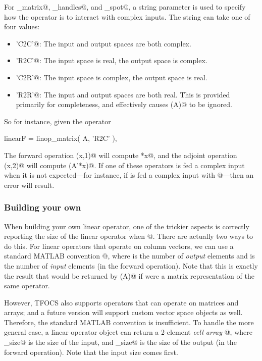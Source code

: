 \documentclass{article}
\begin{document}
For \verb@linop_matrix@, \verb@linop_handles@, and \verb@linop_spot@, a
string parameter \verb@cmode@ is used to specify how the operator is to interact
with complex inputs. The string can take one of four values:
\begin{itemize}
\item \verb@'C2C'@: The input and output spaces are both complex.
\item \verb@'R2C'@: The input space is real, the output space is complex.
\item \verb@'C2R'@: The input space is complex, the output space is real.
\item \verb@'R2R'@: The input and output spaces are both real. This is provided
primarily for completeness, and effectively causes \verb@imag(A)@ to be ignored.
\end{itemize}
So for instance, given the operator
\begin{code}
	linearF = linop_matrix( A, 'R2C' ),
\end{code}
The forward operation \verb@linearF(x,1)@ will compute \verb@A*x@, and the
adjoint operation \verb@linearF(x,2)@ will compute \verb@real(A'*x)@. If
one of these operators is fed a complex input when it is not expected---for
instance, if \verb@linearF@ is fed a complex input with @---then
an error will result.

\subsubsection{Building your own}
\label{sec:linearb}

When building your own linear operator, one of the trickier
aspects is correctly reporting the size of the linear operator when
@. There are actually two ways to do this. For linear
operators that operate on column vectors, we can use a standard MATLAB
convention \verb@[m,n]@, where \verb@m@ is the number of \emph{output} elements and
\verb@n@ is the number of \verb@n@ \emph{input} elements (in the forward operation).
Note that this is exactly the result that would be returned by \verb@size(A)@ if \verb@A@
were a matrix representation of the same operator.

However, TFOCS also supports operators that can operate on matrices and
arrays; and a future version will support custom vector space objects
as well. Therefore, the standard MATLAB convention is insufficient. To
handle the more general case, a linear operator object can return a
2-element \emph{cell array} @, where
 \verb@i_size@ is the size of the input, and \verb@o_size@ is
the size of the output (in the forward operation). Note that the input
size comes first.
\end{document}
